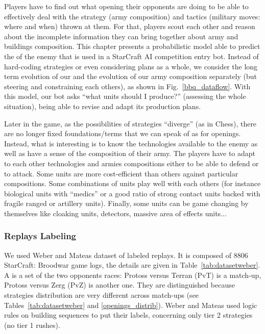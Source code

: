 Players have to find out what opening their opponents are doing to be able to effectively deal with the strategy (army composition) and tactics (military moves: where and when) thrown at them. For that, players scout each other and reason about the incomplete information they can bring together about army and buildings composition. This chapter presents a probabilistic model able to predict the \textit{} of the enemy that is used in a StarCraft AI competition entry bot. Instead of hard-coding strategies or even considering plans as a whole, we consider the long term evolution of our  and the evolution of our army composition separately (but steering and constraining each others), as shown in Fig.~\ref{bbq_dataflow}. With this model, our bot asks ``what units should I produce?'' (assessing the whole situation), being able to revise and adapt its production plans.

Later in the game, as the possibilities of strategies ``diverge'' (as in Chess), there are no longer fixed foundations/terms that we can speak of as for openings. Instead, what is interesting is to know the technologies available to the enemy as well as have a sense of the composition of their army. The players have to adapt to each other technologies and armies compositions either to be able to defend or to attack. Some units are more cost-efficient than others against particular compositions. Some combinations of units play well with each others (for instance biological units with ``medics'' or a good ratio of strong contact units backed with fragile ranged or artillery units). Finally, some units can be game changing by themselves like cloaking units, detectors, massive area of effects units... 

\subsubsection{Replays Labeling}
We used Weber and Mateas \citep{weberStrat} dataset of labeled replays. It is composed of 8806 StarCraft: Broodwar game logs, the details are given in Table~\ref{tab:datasetweber}. A  is a set of the two opponents races: Protoss versus Terran (PvT) is a match-up, Protoss versus Zerg (PvZ) is another one. They are distinguished because strategies distribution are very different across match-ups (see Tables~\ref{tab:datasetweber} and \ref{openings_distrib}). Weber and Mateas used logic rules on building sequences to put their labels, concerning only tier 2 strategies (no tier 1 rushes).

